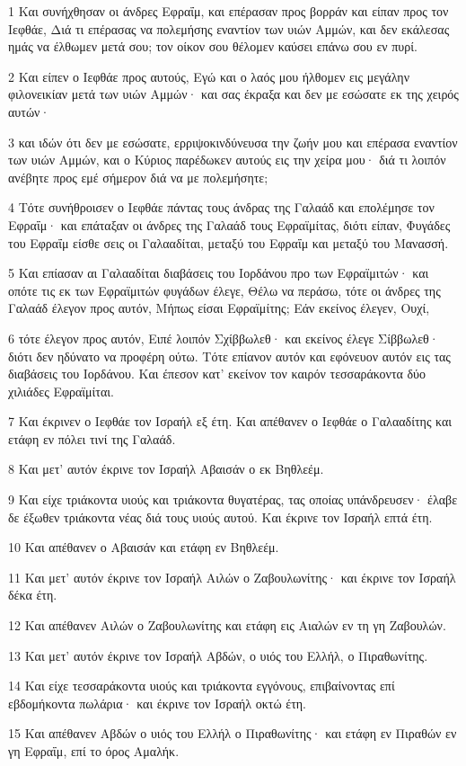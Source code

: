 \par 1 Και συνήχθησαν οι άνδρες Εφραΐμ, και επέρασαν προς βορράν και είπαν προς τον Ιεφθάε, Διά τι επέρασας να πολεμήσης εναντίον των υιών Αμμών, και δεν εκάλεσας ημάς να έλθωμεν μετά σου; τον οίκον σου θέλομεν καύσει επάνω σου εν πυρί.
\par 2 Και είπεν ο Ιεφθάε προς αυτούς, Εγώ και ο λαός μου ήλθομεν εις μεγάλην φιλονεικίαν μετά των υιών Αμμών· και σας έκραξα και δεν με εσώσατε εκ της χειρός αυτών·
\par 3 και ιδών ότι δεν με εσώσατε, ερριψοκινδύνευσα την ζωήν μου και επέρασα εναντίον των υιών Αμμών, και ο Κύριος παρέδωκεν αυτούς εις την χείρα μου· διά τι λοιπόν ανέβητε προς εμέ σήμερον διά να με πολεμήσητε;
\par 4 Τότε συνήθροισεν ο Ιεφθάε πάντας τους άνδρας της Γαλαάδ και επολέμησε τον Εφραΐμ· και επάταξαν οι άνδρες της Γαλαάδ τους Εφραϊμίτας, διότι είπαν, Φυγάδες του Εφραΐμ είσθε σεις οι Γαλααδίται, μεταξύ του Εφραΐμ και μεταξύ του Μανασσή.
\par 5 Και επίασαν αι Γαλααδίται διαβάσεις του Ιορδάνου προ των Εφραϊμιτών· και οπότε τις εκ των Εφραϊμιτών φυγάδων έλεγε, Θέλω να περάσω, τότε οι άνδρες της Γαλαάδ έλεγον προς αυτόν, Μήπως είσαι Εφραϊμίτης; Εάν εκείνος έλεγεν, Ουχί,
\par 6 τότε έλεγον προς αυτόν, Ειπέ λοιπόν Σχίββωλεθ· και εκείνος έλεγε Σίββωλεθ· διότι δεν ηδύνατο να προφέρη ούτω. Τότε επίανον αυτόν και εφόνευον αυτόν εις τας διαβάσεις του Ιορδάνου. Και έπεσον κατ' εκείνον τον καιρόν τεσσαράκοντα δύο χιλιάδες Εφραϊμίται.
\par 7 Και έκρινεν ο Ιεφθάε τον Ισραήλ εξ έτη. Και απέθανεν ο Ιεφθάε ο Γαλααδίτης και ετάφη εν πόλει τινί της Γαλαάδ.
\par 8 Και μετ' αυτόν έκρινε τον Ισραήλ Αβαισάν ο εκ Βηθλεέμ.
\par 9 Και είχε τριάκοντα υιούς και τριάκοντα θυγατέρας, τας οποίας υπάνδρευσεν· έλαβε δε έξωθεν τριάκοντα νέας διά τους υιούς αυτού. Και έκρινε τον Ισραήλ επτά έτη.
\par 10 Και απέθανεν ο Αβαισάν και ετάφη εν Βηθλεέμ.
\par 11 Και μετ' αυτόν έκρινε τον Ισραήλ Αιλών ο Ζαβουλωνίτης· και έκρινε τον Ισραήλ δέκα έτη.
\par 12 Και απέθανεν Αιλών ο Ζαβουλωνίτης και ετάφη εις Αιαλών εν τη γη Ζαβουλών.
\par 13 Και μετ' αυτόν έκρινε τον Ισραήλ Αβδών, ο υιός του Ελλήλ, ο Πιραθωνίτης.
\par 14 Και είχε τεσσαράκοντα υιούς και τριάκοντα εγγόνους, επιβαίνοντας επί εβδομήκοντα πωλάρια· και έκρινε τον Ισραήλ οκτώ έτη.
\par 15 Και απέθανεν Αβδών ο υιός του Ελλήλ ο Πιραθωνίτης· και ετάφη εν Πιραθών εν γη Εφραΐμ, επί το όρος Αμαλήκ.

